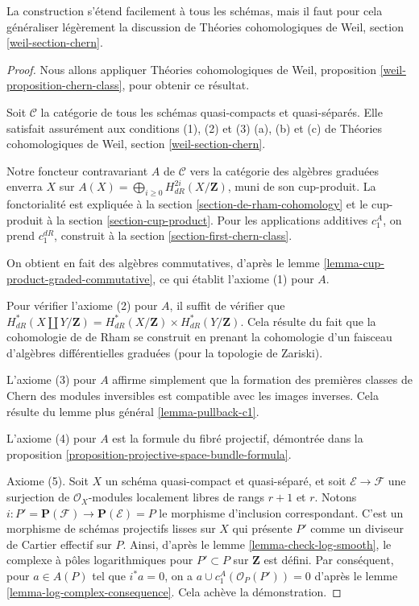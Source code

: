 \noindent
La construction s'étend facilement à tous les schémas, mais il faut pour cela
généraliser légèrement la discussion de Théories cohomologiques de Weil,
section \ref{weil-section-chern}.

\begin{proof}
Nous allons appliquer Théories cohomologiques de Weil, proposition
\ref{weil-proposition-chern-class}, pour obtenir ce résultat.

\medskip\noindent
Soit $\mathcal{C}$ la catégorie de tous les schémas quasi-compacts et quasi-séparés.
Elle satisfait assurément aux conditions
(1), (2) et (3) (a), (b) et (c) de Théories cohomologiques de Weil,
section \ref{weil-section-chern}.

\medskip\noindent
Notre foncteur contravariant $A$ de $\mathcal{C}$ vers la
catégorie des algèbres graduées enverra $X$ sur
$A(X) = \bigoplus_{i \geq 0} H_{dR}^{2i}(X/\mathbf{Z})$,
muni de son cup-produit.
La fonctorialité est expliquée à la section \ref{section-de-rham-cohomology}
et le cup-produit à la section \ref{section-cup-product}.
Pour les applications additives $c_1^A$, on prend $c_1^{dR}$, construit
à la section \ref{section-first-chern-class}.

\medskip\noindent
On obtient en fait des algèbres commutatives, d'après
le lemme \ref{lemma-cup-product-graded-commutative},
ce qui établit l'axiome (1) pour $A$.

\medskip\noindent
Pour vérifier l'axiome (2) pour $A$, il suffit de vérifier que
$H^*_{dR}(X \coprod Y/\mathbf{Z}) =  H^*_{dR}(X/\mathbf{Z}) \times
H^*_{dR}(Y/\mathbf{Z})$.
Cela résulte du fait que la cohomologie de de Rham
se construit en prenant la cohomologie d'un faisceau d'algèbres différentielles
graduées (pour la topologie de Zariski).

\medskip\noindent
L'axiome (3) pour $A$ affirme simplement que la formation des premières classes
de Chern des modules inversibles est compatible avec les images inverses.
Cela résulte du lemme plus général \ref{lemma-pullback-c1}.

\medskip\noindent
L'axiome (4) pour $A$ est la formule du fibré projectif,
démontrée dans la proposition \ref{proposition-projective-space-bundle-formula}.

\medskip\noindent
Axiome (5). Soit $X$ un schéma quasi-compact et quasi-séparé, et
soit $\mathcal{E} \to \mathcal{F}$ une surjection de
$\mathcal{O}_X$-modules localement libres de rangs $r + 1$ et $r$. Notons
$i : P' = \mathbf{P}(\mathcal{F}) \to \mathbf{P}(\mathcal{E}) = P$
le morphisme d'inclusion correspondant. C'est un morphisme de schémas projectifs lisses
sur $X$ qui présente $P'$ comme un diviseur de Cartier effectif sur $P$.
Ainsi, d'après le lemme \ref{lemma-check-log-smooth}, le complexe à pôles logarithmiques
pour $P' \subset P$ sur $\mathbf{Z}$ est défini.
Par conséquent, pour $a \in A(P)$ tel que $i^*a = 0$, on a
$a \cup c_1^A(\mathcal{O}_P(P')) = 0$ d'après
le lemme \ref{lemma-log-complex-consequence}.
Cela achève la démonstration.
\end{proof}


